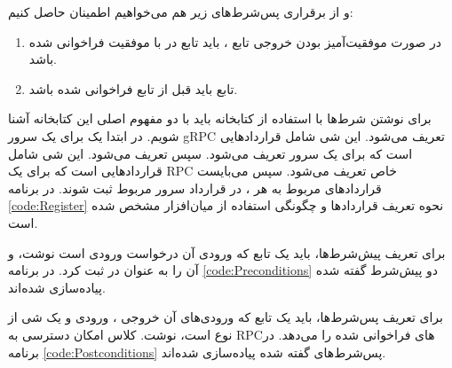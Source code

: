 و از برقراری پس‌شرط‌های زیر هم می‌خواهیم اطمینان حاصل کنیم:
\begin{enumerate}
\item
در صورت موفقیت‌آمیز بودن خروجی تابع
، باید تابع
در
با موفقیت فراخوانی شده باشد.
\item
تابع
باید قبل از تابع
فراخوانی شده باشد.
\end{enumerate}


برای نوشتن شرط‌ها با استفاده از کتابخانه
باید با دو مفهوم اصلی این کتابخانه آشنا شویم. در ابتدا یک
برای یک سرور gRPC تعریف می‌شود. این شی شامل قراردادهایی است که برای یک سرور تعریف می‌شود. سپس
تعریف می‌شود. این شی شامل قراردادهایی است که برای یک RPC خاص تعریف می‌شود. سپس می‌بایست قراردادهای مربوط به هر
،
در قرارداد سرور مربوط ثبت شوند. در برنامه 
\ref{code:Register}
نحوه تعریف قراردادها و چگونگی استفاده از میان‌افزار مشخص شده است.

\singlespacing
\begin{figure}
	\begin{LTR}
		
	\end{LTR}
\end{figure}
\doublespacing

برای تعریف پیش‌شرط‌ها، باید یک تابع که ورودی آن درخواست ورودی
است نوشت، و آن‌ را به عنوان 
در
ثبت کرد. در برنامه
\ref{code:Preconditions}
دو پیش‌شرط گفته شده پیاده‌سازی شده‌اند.

\singlespacing
\begin{figure}
	\begin{LTR}
		
	\end{LTR}
\end{figure}
\doublespacing

برای تعریف پس‌شرط‌ها، باید یک تابع که ورودی‌‌های آن خروجی
،
ورودی
و یک شی از نوع 
است، نوشت. کلاس 
امکان دسترسی به RPCهای فراخوانی شده را می‌دهد. در برنامه
\ref{code:Postconditions}
پس‌شرط‌های گفته شده پیاده‌سازی شده‌اند.

\singlespacing
\begin{figure}
	\begin{LTR}
		
	\end{LTR}
\end{figure}
\doublespacing
